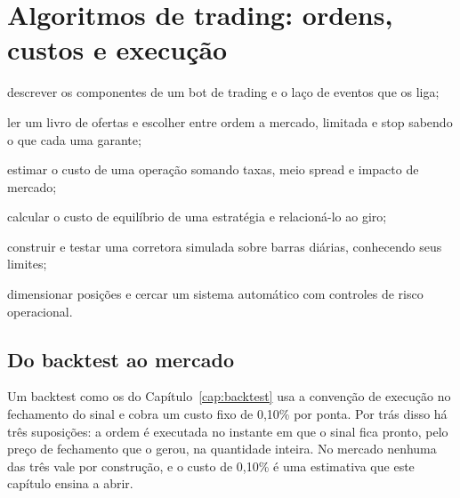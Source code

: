 \chapter{Algoritmos de trading: ordens, custos e execução}
\label{cap:trading}


\begin{objetivos}
  \item descrever os componentes de um bot de trading e o laço de eventos que os liga;
  \item ler um livro de ofertas e escolher entre ordem a mercado, limitada e stop sabendo o que cada uma garante;
  \item estimar o custo de uma operação somando taxas, meio spread e impacto de mercado;
  \item calcular o custo de equilíbrio de uma estratégia e relacioná-lo ao giro;
  \item construir e testar uma corretora simulada sobre barras diárias, conhecendo seus limites;
  \item dimensionar posições e cercar um sistema automático com controles de risco operacional.
\end{objetivos}

\section{Do backtest ao mercado}

Um backtest como os do Capítulo~\ref{cap:backtest} usa a convenção de execução no fechamento do sinal e cobra um custo fixo de 0,10\% por ponta. Por trás disso há três suposições: a ordem é executada no instante em que o sinal fica pronto, pelo preço de fechamento que o gerou, na quantidade inteira. No mercado nenhuma das três vale por construção, e o custo de 0,10\% é uma estimativa que este capítulo ensina a abrir.

